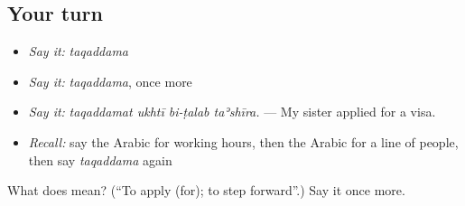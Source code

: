\subsection*{Your turn}
\begin{itemize}
\raggedright
  \item \emph{Say it:} \emph{taqaddama}
  \item \emph{Say it:} \emph{taqaddama}, once more
  \item \emph{Say it:} \emph{taqaddamat ukhtī bi-ṭalab taʾshīra.} — My sister applied for a visa.
  \item \emph{Recall:} say the Arabic for working hours, then the Arabic for a line of people, then say \emph{taqaddama} again
\end{itemize}

\begin{tcolorbox}[breakable,colback=teal!4,colframe=teal!35!black,title={Before you move on}]
What does  mean? (\textquotedblleft{}To apply (for); to step forward\textquotedblright{}.) Say it once more.
\end{tcolorbox}
